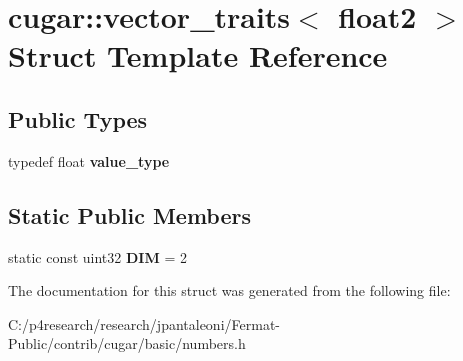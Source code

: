 \hypertarget{structcugar_1_1vector__traits_3_01float2_01_4}{}\section{cugar\+:\+:vector\+\_\+traits$<$ float2 $>$ Struct Template Reference}
\label{structcugar_1_1vector__traits_3_01float2_01_4}
\subsection*{Public Types}
\begin{DoxyCompactItemize}
\item 
\mbox{\label{structcugar_1_1vector__traits_3_01float2_01_4_a661b65ee360ac61f7db7d3d437f9fa76}} 
typedef float {\bfseries value\+\_\+type}
\end{DoxyCompactItemize}
\subsection*{Static Public Members}
\begin{DoxyCompactItemize}
\item 
\mbox{\label{structcugar_1_1vector__traits_3_01float2_01_4_a328710145e328a49fd274f531335c9c6}} 
static const uint32 {\bfseries D\+IM} = 2
\end{DoxyCompactItemize}


The documentation for this struct was generated from the following file\+:\begin{DoxyCompactItemize}
\item 
C\+:/p4research/research/jpantaleoni/\+Fermat-\/\+Public/contrib/cugar/basic/numbers.\+h\end{DoxyCompactItemize}
